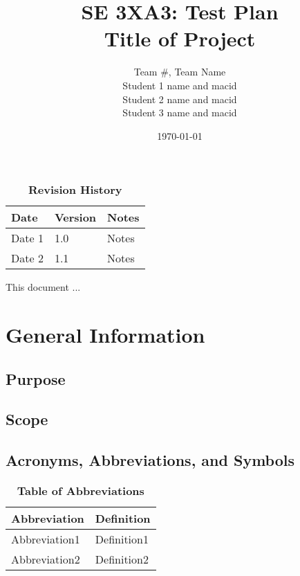 \documentclass[12pt, titlepage]{article}
\title{SE 3XA3: Test Plan\\Title of Project}
\author{Team \#, Team Name
		\\ Student 1 name and macid
		\\ Student 2 name and macid
		\\ Student 3 name and macid
}
\date{\today}
\begin{document}
\maketitle

\tableofcontents
\listoftables
\listoffigures

\begin{table}[bp]
\caption{\bf Revision History}
\begin{tabularx}{\textwidth}{p{3cm}p{2cm}X}
\toprule {\bf Date} & {\bf Version} & {\bf Notes}\\
\midrule
Date 1 & 1.0 & Notes\\
Date 2 & 1.1 & Notes\\
\bottomrule
\end{tabularx}
\end{table}

\newpage


This document ...

\section{General Information}

\subsection{Purpose}

\subsection{Scope}

\subsection{Acronyms, Abbreviations, and Symbols}

\begin{table}[hbp]
\caption{\textbf{Table of Abbreviations}} \label{Table}

\begin{tabularx}{\textwidth}{p{3cm}X}
\toprule
\textbf{Abbreviation} & \textbf{Definition} \\
\midrule
Abbreviation1 & Definition1\\
Abbreviation2 & Definition2\\
\bottomrule
\end{tabularx}

\end{table}
\end{document}
